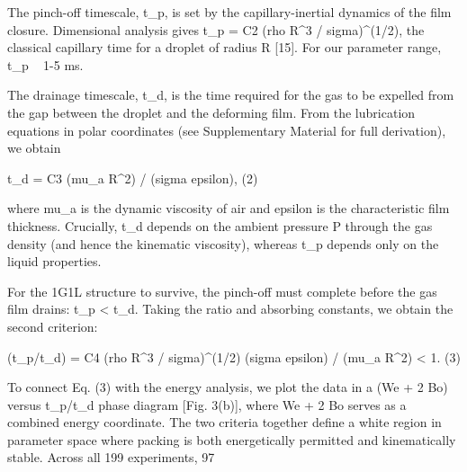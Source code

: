 The pinch-off timescale, t_p, is set by the capillary-inertial dynamics of the film closure. Dimensional analysis gives t_p = C2 (rho R^3 / sigma)^(1/2), the classical capillary time for a droplet of radius R [15]. For our parameter range, t_p ~ 1-5 ms.

The drainage timescale, t_d, is the time required for the gas to be expelled from the gap between the droplet and the deforming film. From the lubrication equations in polar coordinates (see Supplementary Material for full derivation), we obtain

  t_d = C3 (mu_a R^2) / (sigma epsilon),                    (2)

where mu_a is the dynamic viscosity of air and epsilon is the characteristic film thickness. Crucially, t_d depends on the ambient pressure P through the gas density (and hence the kinematic viscosity), whereas t_p depends only on the liquid properties.

For the 1G1L structure to survive, the pinch-off must complete before the gas film drains: t_p < t_d. Taking the ratio and absorbing constants, we obtain the second criterion:

  (t_p/t_d) = C4 (rho R^3 / sigma)^(1/2) (sigma epsilon) / (mu_a R^2) < 1.  (3)

To connect Eq. (3) with the energy analysis, we plot the data in a (We + 2 Bo) versus t_p/t_d phase diagram [Fig. 3(b)], where We + 2 Bo serves as a combined energy coordinate. The two criteria together define a white region in parameter space where packing is both energetically permitted and kinematically stable. Across all 199 experiments, 97%

